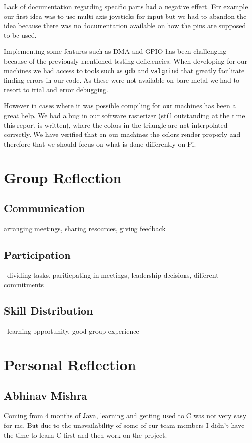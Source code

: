 \documentclass[11pt]{article}
\begin{document}
Lack of documentation regarding specific parts had a negative effect.  For
example our first idea was to use multi axis joysticks for input but we had to
abandon the idea because there was no documentation available on how the pins
are supposed to be used.

Implementing some features such as DMA and GPIO has been challenging because of
the previously mentioned testing deficiencies. When developing for our machines
we had access to tools such as \texttt{gdb} and \texttt{valgrind} that greatly
facilitate finding errors in our code. As these were not available on bare metal
we had to resort to trial and error debugging.

However in cases where it was possible compiling for our machines has been
a great help. We had a bug in our software rasterizer (still outstanding at the
time this report is written), where the colors in the triangle are not
interpolated correctly. We have verified that on our machines the colors render
properly and therefore that we should focus on what is done differently on Pi.

\section{Group Reflection}

\subsection{Communication}

arranging meetings, sharing resources, giving feedback

\subsection{Participation}

--dividing tasks, pariticpating in meetings, leadership decisions, different
commitments

\subsection{Skill Distribution}

--learning opportunity, good group experience

\section{Personal Reflection}

\subsection{Abhinav Mishra}
Coming from 4 months of Java, learning and getting used to C was not very easy
for me. But due to the unavailability of some of our team members I didn't
have the time to learn C first and then work on the project.
\end{document}
